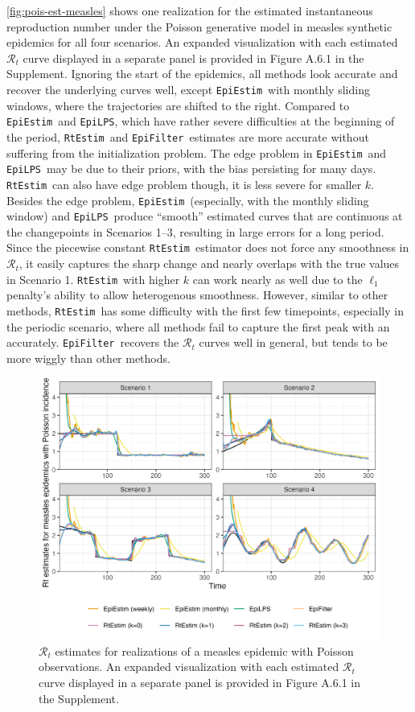 \documentclass[10pt,letterpaper]{article}
\def\RtEstim{\texttt{RtEstim}}
\def\EpiEstim{\texttt{EpiEstim}}
\def\EpiLPS{\texttt{EpiLPS}}
\def\EpiFilter{\texttt{EpiFilter}}
\def\calR{\mathcal{R}}
\begin{document}
\autoref{fig:pois-est-measles} shows one realization for the estimated
instantaneous reproduction number under the Poisson generative model in measles
synthetic epidemics for all four scenarios. An expanded visualization with each
estimated $\calR_t$ curve displayed in a separate panel is provided in Figure
A.6.1 in the Supplement. Ignoring the start of the epidemics, all methods look
accurate and recover the underlying curves well, except \EpiEstim\ with monthly
sliding windows, where the trajectories are shifted to the right. Compared to
\EpiEstim\ and \EpiLPS, which have rather severe difficulties at the beginning
of the period, \RtEstim\ and \EpiFilter\ estimates are more accurate without
suffering from the initialization problem. The edge problem in \EpiEstim\ and
\EpiLPS\ may be due to their priors, with the bias persisting for many days.
\RtEstim\ can also have edge problem though, it is less severe for smaller $k$.
Besides the edge problem, \EpiEstim\ (especially, with the monthly sliding
window) and \EpiLPS\ produce ``smooth'' estimated curves that are continuous at
the changepoints in Scenarios 1--3, resulting in large errors for a long period.
Since the piecewise constant \RtEstim\ estimator does not force any smoothness
in $\calR_t$, it easily captures the sharp change and nearly overlaps with the
true values in Scenario 1. \RtEstim\ with higher $k$ can work nearly as well due
to the $\ell_1$ penalty's ability to allow heterogenous smoothness. However,
similar to other methods, \RtEstim\ has some difficulty with the first few
timepoints, especially in the periodic scenario, where all methods fail to
capture the first peak with an accurately. \EpiFilter\ recovers the $\calR_t$
curves well in general, but tends to be more wiggly than other methods. 


\begin{figure}[!t]
  \centering
  \includegraphics[width=.9\linewidth]{fig/fig_res_pois_measles.png}
  \caption{$\calR_t$ estimates for realizations of a measles epidemic with
    Poisson observations. An expanded visualization with each estimated
    $\calR_t$ curve displayed in a separate panel is provided in Figure A.6.1 in
    the Supplement.}
  \label{fig:pois-est-measles}
\end{figure}
\end{document}
